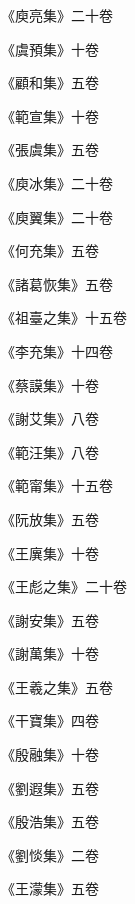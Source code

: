 \begin{pinyinscope}
 《庾亮集》二十卷



 《虞預集》十卷



 《顧和集》五卷



 《範宣集》十卷



 《張虞集》五卷



 《庾冰集》二十卷



 《庾翼集》二十卷



 《何充集》五卷



 《諸葛恢集》五卷



 《祖臺之集》十五卷



 《李充集》十四卷



 《蔡謨集》十卷



 《謝艾集》八卷



 《範汪集》八卷



 《範甯集》十五卷



 《阮放集》五卷



 《王廙集》十卷



 《王彪之集》二十卷



 《謝安集》五卷



 《謝萬集》十卷



 《王羲之集》五卷



 《干寶集》四卷



 《殷融集》十卷



 《劉遐集》五卷



 《殷浩集》五卷



 《劉惔集》二卷



 《王濛集》五卷




\end{pinyinscope}
